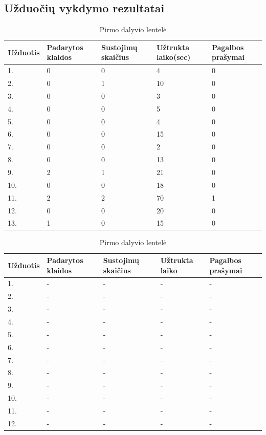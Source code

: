 \documentclass[oneside]{VUMIFPSkursinis}
\begin{document}
\subsection{Užduočių vykdymo rezultatai}
\begin{center}
	\begin{table}[!pht]
	\caption{Pirmo dalyvio lentelė}
	\begin{tabular}{ |p{1.8cm} | p{3.4cm} | p{3.4cm} | p{2.5cm} | p{3.5cm}|}
	\hline
	Užduotis&Padarytos klaidos&Sustojimų skaičius&Užtrukta laiko(sec)&Pagalbos prašymai\\ \hline
1.&0&0&4&0 \\ \hline
2.&0&1&10&0 \\ \hline
3.&0&0&3&0 \\ \hline
4.&0&0&5&0 \\ \hline
5.&0&0&4&0 \\ \hline
6.&0&0&15&0 \\ \hline
7.&0&0&2&0 \\ \hline
8.&0&0&13&0 \\ \hline
9.&2&1&21&0 \\ \hline
10.&0&0&18&0 \\ \hline
11.&2&2&70&1 \\ \hline
12.&0&0&20&0 \\ \hline
13.&1&0&15&0 \\ \hline
\end{tabular}
\end{table}
\vspace{0.7cm}
	\begin{table}[!pht]
	\caption{Pirmo dalyvio lentelė}
	\begin{tabular}{ |p{1.8cm} | p{3.4cm} | p{3.4cm} | p{2.5cm} | p{3.5cm}|}
	\hline
	Užduotis&Padarytos klaidos&Sustojimų skaičius&Užtrukta laiko&Pagalbos prašymai\\ \hline
1.&-&-&-&- \\ \hline
2.&-&-&-&- \\ \hline
3.&-&-&-&- \\ \hline
4.&-&-&-&- \\ \hline
5.&-&-&-&- \\ \hline
6.&-&-&-&- \\ \hline
7.&-&-&-&- \\ \hline
8.&-&-&-&- \\ \hline
9.&-&-&-&- \\ \hline
10.&-&-&-&- \\ \hline
11.&-&-&-&- \\ \hline
12.&-&-&-&- \\ \hline

\end{tabular}
\end{table}
\end{center}
\end{document}
